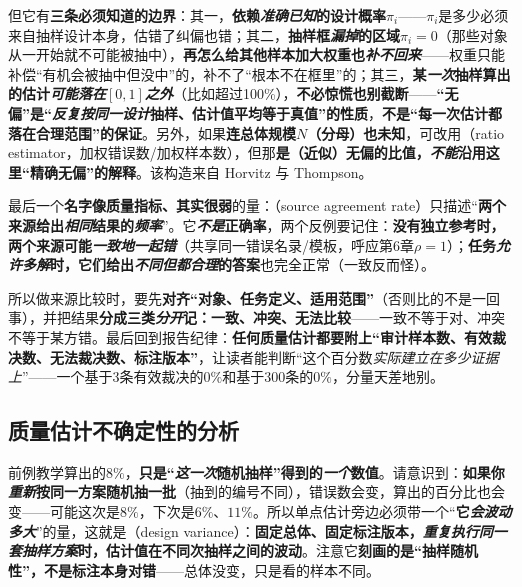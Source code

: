 但它有\textbf{三条必须知道的边界}：其一，\textbf{依赖\emph{准确已知}的设计概率$\pi_i$}——$\pi_i$是多少必须来自抽样设计本身，估错了纠偏也错；其二，\textbf{抽样框\emph{漏掉}的区域$\pi_i=0$}（那些对象从一开始就不可能被抽中），\textbf{再怎么给其他样本加大权重也\emph{补不回来}}——权重只能补偿“有机会被抽中但没中”的，补不了“根本不在框里”的；其三，\textbf{某\emph{一次}抽样算出的估计\emph{可能落在$[0,1]$之外}}（比如超过100\%），\textbf{不必惊慌也别截断}——\textbf{“无偏”是“\emph{反复按同一设计}抽样、估计值平均等于真值”的性质}，\textbf{不是“每一次估计都落在合理范围”的保证}。另外，如果\textbf{连总体规模$N$（分母）也未知}，可改用（ratio estimator，加权错误数/加权样本数），但那\textbf{是（近似）无偏的比值，\emph{不能}沿用这里“精确无偏”的解释}。该构造来自 Horvitz 与 Thompson。

最后一个\textbf{名字像质量指标、其实很弱}的量：（source agreement rate）只描述“\textbf{两个来源给出\emph{相同}结果的\emph{频率}}”。它\textbf{\emph{不是}正确率}，两个反例要记住：\textbf{没有独立参考时，两个来源可能\emph{一致地一起错}}（共享同一错误名录/模板，呼应第6章$\rho=1$）；\textbf{任务\emph{允许多解}时，它们给出\emph{不同但都合理}的答案}也完全正常（一致反而怪）。

所以做来源比较时，要先\textbf{对齐“对象、任务定义、适用范围”}（否则比的不是一回事），并把结果\textbf{分成三类\emph{分开}记：一致、冲突、无法比较}——一致不等于对、冲突不等于某方错。最后回到报告纪律：\textbf{任何质量估计都要附上“审计样本数、有效裁决数、无法裁决数、标注版本”}，让读者能判断“这个百分数\emph{实际建立在多少证据上}”——一个基于$3$条有效裁决的$0\%$和基于$300$条的$0\%$，分量天差地别。

\subsection{质量估计不确定性的分析}
\label{sec:knowledge-quality-assessment-correction-uncertainty}

前例教学算出的$8\%$，\textbf{只是“\emph{这一次}随机抽样”得到的\emph{一个}数值}。请意识到：\textbf{如果你\emph{重新}按同一方案随机抽一批}（抽到的编号不同），错误数会变，算出的百分比也会变——可能这次是$8\%$，下次是$6\%$、$11\%$。所以单点估计旁边必须带一个“\textbf{它\emph{会波动多大}}”的量，这就是（design variance）：\textbf{固定总体、固定标注版本，\emph{重复执行同一套抽样方案}时，估计值在不同次抽样之间的波动}。注意它\textbf{刻画的是“抽样随机性”，不是标注本身对错}——总体没变，只是看的样本不同。

